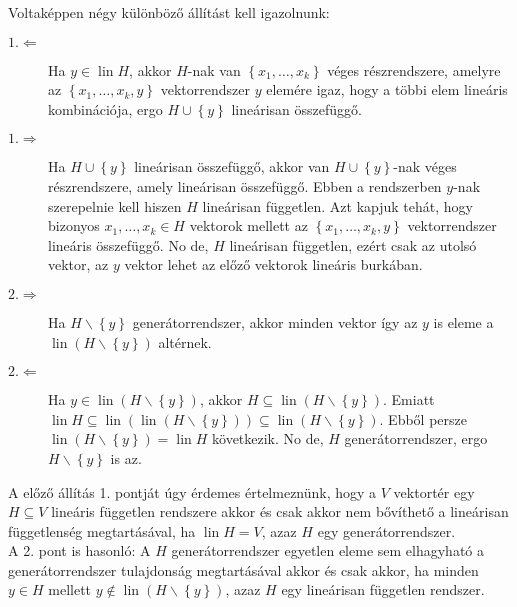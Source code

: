 \documentclass[a4paper, showtrims]{memoir}
\makeatletter
\renewenvironment{proof}[1][\proofname]
    {\par\pushQED{\qed}%
    \normalfont \topsep6\p@\@plus6\p@\relax
    \trivlist
    \item[\hskip\labelsep
        \itshape
    #1\@addpunct{:}]\ignorespaces}
    {\popQED\endtrivlist\@endpefalse}
\theoremstyle{plain}
\theoremstyle{remark}
\theoremstyle{definition}
\DeclareMathOperator{\lin}{lin}
\makeatother
\begin{document}
\begin{proof}
    Voltaképpen négy különböző állítást kell igazolnunk:
    \begin{description}
        \item[$1.\Leftarrow$]
            Ha $y\in\lin H$, akkor $H$-nak van $\left\{ x_1,\ldots,x_k \right\}$ véges részrendszere,
            amelyre az $\left\{ x_1,\ldots,x_k,y \right\}$ vektorrendszer $y$ elemére igaz, hogy a többi elem lineáris kombinációja,
            ergo $H\cup\left\{ y \right\}$ lineárisan összefüggő.
        \item[$1.\Rightarrow$]
            Ha $H\cup\left\{ y \right\}$ lineárisan összefüggő, akkor van $H\cup\left\{ y \right\}$-nak véges részrendszere, amely lineárisan összefüggő.
            Ebben a rendszerben $y$-nak szerepelnie kell hiszen $H$ lineárisan független.
            Azt kapjuk tehát, hogy bizonyos $x_1,\ldots,x_k\in H$ vektorok mellett az $\left\{ x_1,\ldots,x_k,y \right\}$ vektorrendszer lineáris összefüggő.
            No de, $H$ lineárisan független, ezért csak az utolsó vektor, az $y$ vektor lehet az előző vektorok lineáris burkában.
        \item[$2.\Rightarrow$]
            Ha $H\smallsetminus\left\{ y \right\}$ generátorrendszer, akkor minden vektor így az $y$ is eleme a $\lin\left( H\smallsetminus\left\{ y \right\} \right)$ altérnek.
        \item[$2.\Leftarrow$]
            Ha $y\in\lin\left( H\smallsetminus\left\{ y \right\} \right)$, akkor $H\subseteq\lin\left( H\smallsetminus\left\{ y \right\} \right)$.
            Emiatt $\lin H\subseteq\lin\left( \lin\left( H\smallsetminus\left\{ y \right\} \right) \right)\subseteq\lin\left( H\smallsetminus\left\{ y \right\} \right)$.
            Ebből persze $\lin\left( H\smallsetminus\left\{ y \right\} \right)=\lin H$ következik.
            No de, $H$ generátorrendszer, ergo $H\smallsetminus\left\{ y \right\}$ is az.
            \qedhere
    \end{description}
\end{proof}
A előző állítás 1. pontját úgy érdemes értelmeznünk, hogy a $V$ vektortér egy $H\subseteq V$ lineáris független rendszere akkor és csak akkor nem bővíthető a lineárisan függetlenség megtartásával, ha $\lin H=V$, azaz $H$ egy generátorrendszer.
\\
A 2. pont is hasonló: A $H$ generátorrendszer egyetlen eleme sem elhagyható a generátorrendszer tulajdonság megtartásával akkor és csak akkor, ha minden $y\in H$ mellett $y\notin\lin\left( H\smallsetminus\left\{y \right\} \right)$, azaz $H$ egy lineárisan független rendszer.
\end{document}
